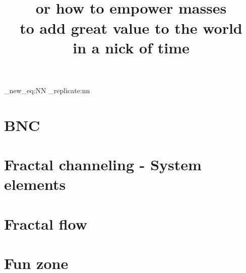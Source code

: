 

\title{\\  \huge or how to empower masses\\to add great value to the world\\in a nick of time}

\maketitle
\newpage
\tableofcontents  
\newpage
\listoftables
\newpage
\listoffigures

\setcounter{secnumdepth}{4}


\ExplSyntaxOn
\cs_new_eq:NN \Repeat \prg_replicate:nn
\ExplSyntaxOff


\newpage
\part{BNC}

\part{Fractal channeling - System elements}

\part{Fractal flow} 

\part{Fun zone}



% 


\newpage


